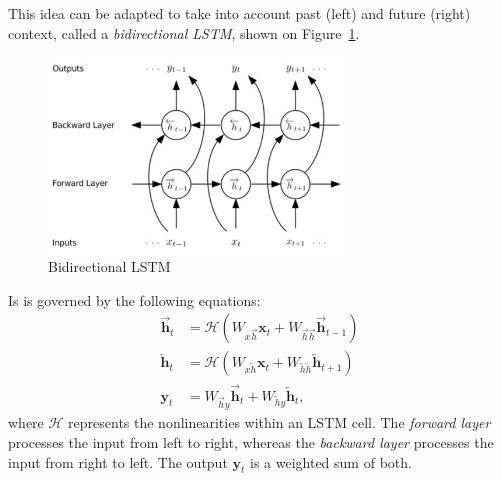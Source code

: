 This idea can be adapted to take into account past (left) and future (right) context, called a \emph{bidirectional LSTM}, shown on Figure~\ref{fig:bilstm}.
\begin{figure}[!hbtp]
	\centering
	\includegraphics[width=0.7\textwidth]{img/bilstm}
	\caption{Bidirectional LSTM}
	\label{fig:bilstm}
\end{figure}
Is is governed by the following equations:
\begin{align*}
	\overrightarrow{\bm{h}}_t &= \mathscr{H}\left(W_{x\overrightarrow{h}} \bm{x}_t + W_{\overrightarrow{h}\overrightarrow{h}} \overrightarrow{\bm{h}}_{t-1}\right)\\
	\overleftarrow{\bm{h}}_t &= \mathscr{H}\left(W_{x\overleftarrow{h}} \bm{x}_t + W_{\overleftarrow{h}\overleftarrow{h}} \overleftarrow{\bm{h}}_{t+1}\right)\\
	\bm{y}_t &= W_{\overrightarrow{h} y} \overrightarrow{\bm{h}}_t + W_{\overleftarrow{h} y} \overleftarrow{\bm{h}}_t,
\end{align*}
where \(\mathscr{H}\) represents the nonlinearities within an LSTM cell.
The \emph{forward layer} processes the input from left to right, whereas the \emph{backward layer} processes the input from right to left.
The output \(\bm{y}_t\) is a weighted sum of both.

